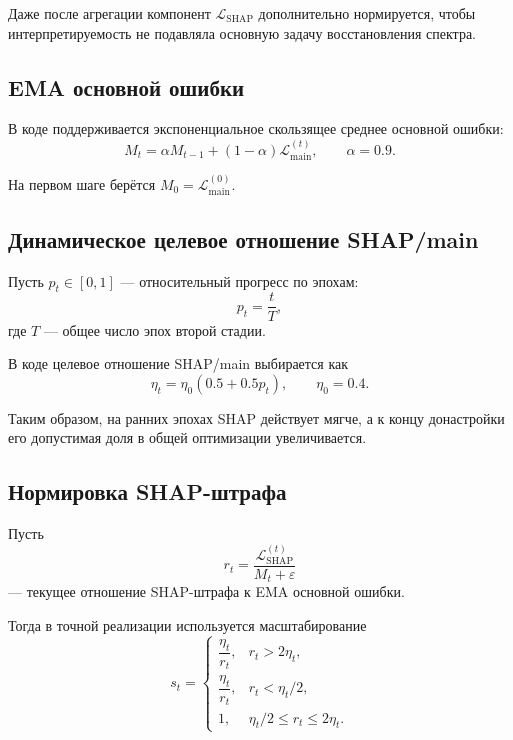 \documentclass[11pt]{article}
\begin{document}
Даже после агрегации компонент $\mathcal{L}_{\mathrm{SHAP}}$ дополнительно нормируется, чтобы интерпретируемость не подавляла основную задачу восстановления спектра.

\subsection{EMA основной ошибки}

В коде поддерживается экспоненциальное скользящее среднее основной ошибки:
\begin{equation}
M_t = \alpha M_{t-1} + (1-\alpha)\mathcal{L}_{\mathrm{main}}^{(t)},
\qquad
\alpha = 0.9.
\end{equation}

На первом шаге берётся $M_0 = \mathcal{L}_{\mathrm{main}}^{(0)}$.

\subsection{Динамическое целевое отношение SHAP/main}

Пусть $p_t \in [0,1]$ --- относительный прогресс по эпохам:
\begin{equation}
 p_t = \frac{t}{T},
\end{equation}
где $T$ --- общее число эпох второй стадии.

В коде целевое отношение SHAP/main выбирается как
\begin{equation}
\eta_t = \eta_0 (0.5 + 0.5 p_t),
\qquad
\eta_0 = 0.4.
\end{equation}

Таким образом, на ранних эпохах SHAP действует мягче, а к концу донастройки его допустимая доля в общей оптимизации увеличивается.

\subsection{Нормировка SHAP-штрафа}

Пусть
\begin{equation}
 r_t = \frac{\mathcal{L}_{\mathrm{SHAP}}^{(t)}}{M_t + \varepsilon}
\end{equation}
--- текущее отношение SHAP-штрафа к EMA основной ошибки.

Тогда в точной реализации используется масштабирование
\begin{equation}
 s_t =
 \begin{cases}
 \dfrac{\eta_t}{r_t}, & r_t > 2\eta_t,\\[6pt]
 \dfrac{\eta_t}{r_t}, & r_t < \eta_t/2,\\[6pt]
 1, & \eta_t/2 \le r_t \le 2\eta_t.
 \end{cases}
\end{equation}
\end{document}
